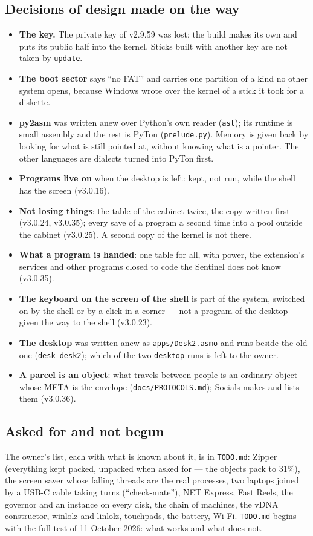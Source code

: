 \documentclass[11pt,a4paper]{article}
\newcommand{\file}[1]{\texttt{#1}}
\newcommand{\cmd}[1]{\texttt{#1}}
\begin{document}
\subsection{Decisions of design made on the way}
\begin{itemize}
\item \textbf{The key.} The private key of v2.9.59 was lost; the build makes its own and puts
      its public half into the kernel. Sticks built with another key are not taken by
      \cmd{update}.
\item \textbf{The boot sector} says ``no FAT'' and carries one partition of a kind no other
      system opens, because Windows wrote over the kernel of a stick it took for a diskette.
\item \textbf{py2asm} was written anew over Python's own reader (\texttt{ast}); its runtime
      is small assembly and the rest is PyTon (\file{prelude.py}). Memory is given back by
      looking for what is still pointed at, without knowing what is a pointer. The other
      languages are dialects turned into PyTon first.
\item \textbf{Programs live on} when the desktop is left: kept, not run, while the shell has
      the screen (v3.0.16).
\item \textbf{Not losing things}: the table of the cabinet twice, the copy written first
      (v3.0.24, v3.0.35); every save of a program a second time into a pool outside the
      cabinet (v3.0.25). A second copy of the kernel is not there.
\item \textbf{What a program is handed}: one table for all, with power, the extension's
      services and other programs closed to code the Sentinel does not know (v3.0.35).
\item \textbf{The keyboard on the screen of the shell} is part of the system, switched on by
      the shell or by a click in a corner --- not a program of the desktop given the way to
      the shell (v3.0.23).
\item \textbf{The desktop} was written anew as \file{apps/Desk2.asmo} and runs beside the old
      one (\cmd{desk desk2}); which of the two \cmd{desktop} runs is left to the owner.
\item \textbf{A parcel is an object}: what travels between people is an ordinary object whose
      META is the envelope (\file{docs/PROTOCOLS.md}); Socials makes and lists them (v3.0.36).
\end{itemize}

\subsection{Asked for and not begun}
The owner's list, each with what is known about it, is in \file{TODO.md}: Zipper (everything
kept packed, unpacked when asked for --- the objects pack to 31\%), the screen saver whose
falling threads are the real processes, two laptops joined by a USB-C cable taking turns
(``check-mate''), NET Express, Fast Reels, the governor and an instance on every disk, the
chain of machines, the vDNA constructor, winlolz and linlolz, touchpads, the battery, Wi-Fi.
\file{TODO.md} begins with the full test of 11 October 2026: what works and what does not.
\end{document}
